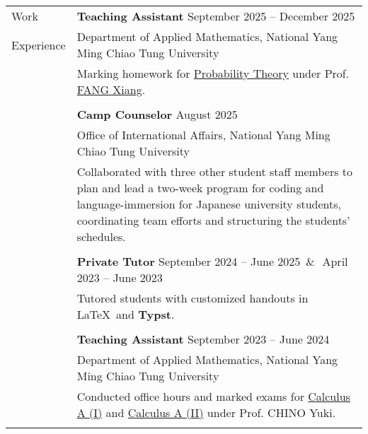 \documentclass[letterpaper, 11pt]{article}
\newcommand{\spaceand}{\,\&\ \,}
\DeclareRobustCommand{\Typst}{\textcolor{TypstColor}{\TypstBuenard\textbf{Typst}}}
\begin{document}
\begin{center}
\begin{longtable}{p{0.76in}p{5.93in}}

        {\textcolor{OliveGreen}{Work}} & \textbf{Teaching Assistant}  \hfill September 2025 -- December 2025 \\
        {\textcolor{OliveGreen}{Experience}} & Department of Applied Mathematics, National Yang Ming Chiao Tung University\\
        & Marking homework for \href{https://reurl.cc/qYaYr3}{Probability Theory} under Prof. \href{https://www.math.nycu.edu.tw/faculty/e_faculty_content.php?S_ID=149&SC_ID=1}{FANG Xiang}.\\
        & \\

        & \textbf{Camp Counselor} \hfill August 2025 \\
        & Office of International Affairs, National Yang Ming Chiao Tung University \\
        & Collaborated with three other student staff members to plan and lead a two-week program for coding and language-immersion for Japanese university students, coordinating team efforts and structuring the students' schedules.\\
        & \\

        & \textbf{Private Tutor} \hfill September 2024 -- June 2025 \spaceand April 2023 -- June 2023 \\
        & Tutored students with customized handouts in \LaTeX\ and \Typst. \\
        & \\
        

        & \textbf{Teaching Assistant}  \hfill September 2023 -- June 2024 \\
        & Department of Applied Mathematics, National Yang Ming Chiao Tung University\\
        & Conducted office hours and marked exams for \href{https://reurl.cc/Djp5jN}{Calculus A (I)} and \href{https://reurl.cc/RqoMez}{Calculus A (II)} under Prof. CHINO Yuki.\\
        & \\


\end{longtable}
\end{center}
\end{document}
